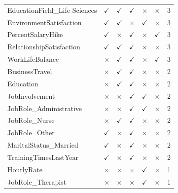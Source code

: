 \documentclass[a4paper,fleqn]{cas-sc}
\begin{document}
{\begin{table}[pos=h]
\begin{tabular}{@{}lcccccc@{}}
        EducationField\_Life Sciences & $\checkmark$ & $\checkmark$ & $\checkmark$ & $\times$ & $\times$ & 3 \\
        EnvironmentSatisfaction & $\checkmark$ & $\checkmark$ & $\times$ & $\checkmark$ & $\times$ & 3 \\
        PercentSalaryHike & $\checkmark$ & $\times$ & $\checkmark$ & $\times$ & $\checkmark$ & 3 \\
        RelationshipSatisfaction & $\checkmark$ & $\checkmark$ & $\checkmark$ & $\times$ & $\times$ & 3 \\
        WorkLifeBalance & $\times$ & $\checkmark$ & $\checkmark$ & $\times$ & $\checkmark$ & 3 \\
        BusinessTravel & $\times$ & $\checkmark$ & $\checkmark$ & $\times$ & $\times$ & 2 \\
        Education & $\times$ & $\checkmark$ & $\checkmark$ & $\times$ & $\times$ & 2 \\
        JobInvolvement & $\times$ & $\times$ & $\checkmark$ & $\checkmark$ & $\times$ & 2 \\
        JobRole\_Administrative & $\times$ & $\times$ & $\checkmark$ & $\checkmark$ & $\times$ & 2 \\
        JobRole\_Nurse & $\times$ & $\checkmark$ & $\checkmark$ & $\times$ & $\times$ & 2 \\
        JobRole\_Other & $\checkmark$ & $\times$ & $\checkmark$ & $\times$ & $\times$ & 2 \\
        MaritalStatus\_Married & $\checkmark$ & $\times$ & $\checkmark$ & $\times$ & $\times$ & 2 \\
        TrainingTimesLastYear & $\checkmark$ & $\times$ & $\checkmark$ & $\times$ & $\times$ & 2 \\
        HourlyRate & $\times$ & $\times$ & $\times$ & $\checkmark$ & $\times$ & 1 \\
        JobRole\_Therapist & $\times$ & $\times$ & $\times$ & $\checkmark$ & $\times$ & 1 \\
        \bottomrule
    \end{tabular}
\end{table}

}
\end{document}
